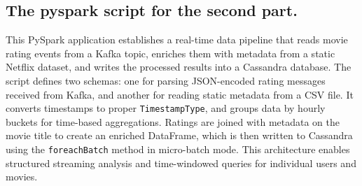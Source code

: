 \documentclass[a4paper,11pt]{article}
\theoremstyle{mytheor}
\begin{document}
\subsection*{The pyspark script for the second part.}
This PySpark application establishes a real-time data pipeline that reads movie rating events from a Kafka topic, enriches them with metadata from a static Netflix dataset, and writes the processed results into a Cassandra database. The script defines two schemas: one for parsing JSON-encoded rating messages received from Kafka, and another for reading static metadata from a CSV file. It converts timestamps to proper \texttt{TimestampType}, and groups data by hourly buckets for time-based aggregations. Ratings are joined with metadata on the movie title to create an enriched DataFrame, which is then written to Cassandra using the \texttt{foreachBatch} method in micro-batch mode. This architecture enables structured streaming analysis and time-windowed queries for individual users and movies.
\end{document}
